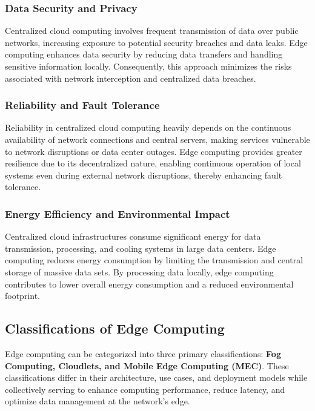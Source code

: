 \documentclass[runningheads]{llncs}
\begin{document}
\subsubsection{Data Security and Privacy}
Centralized cloud computing involves frequent transmission of data over public networks, increasing exposure to potential security breaches and data leaks. Edge computing enhances data security by reducing data transfers and handling sensitive information locally. Consequently, this approach minimizes the risks associated with network interception and centralized data breaches.

\subsubsection{Reliability and Fault Tolerance}
Reliability in centralized cloud computing heavily depends on the continuous availability of network connections and central servers, making services vulnerable to network disruptions or data center outages. Edge computing provides greater resilience due to its decentralized nature, enabling continuous operation of local systems even during external network disruptions, thereby enhancing fault tolerance.

\subsubsection{Energy Efficiency and Environmental Impact}
Centralized cloud infrastructures consume significant energy for data transmission, processing, and cooling systems in large data centers. Edge computing reduces energy consumption by limiting the transmission and central storage of massive data sets. By processing data locally, edge computing contributes to lower overall energy consumption and a reduced environmental footprint.



\subsection{Classifications of Edge Computing}
Edge computing can be categorized into three primary classifications: \textbf{Fog Computing, Cloudlets, and Mobile Edge Computing (MEC)}. These classifications differ in their architecture, use cases, and deployment models while collectively serving to enhance computing performance, reduce latency, and optimize data management at the network's edge.
\end{document}
